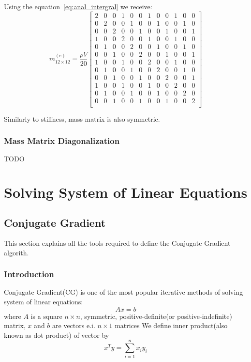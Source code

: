 \documentclass[en]{minipw} %
\begin{document}
Using the equation~\ref{eq:anal_intergral} we receive:
\begin{equation}
m^{(e)}_{12 \times 12} = \dfrac{\rho V}{20}
\begin{bmatrix}
2 & 0 & 0 & 1 & 0 & 0 & 1 & 0 & 0 & 1 & 0 & 0 \\
0 & 2 & 0 & 0 & 1 & 0 & 0 & 1 & 0 & 0 & 1 & 0 \\
0 & 0 & 2 & 0 & 0 & 1 & 0 & 0 & 1 & 0 & 0 & 1 \\
1 & 0 & 0 & 2 & 0 & 0 & 1 & 0 & 0 & 1 & 0 & 0 \\
0 & 1 & 0 & 0 & 2 & 0 & 0 & 1 & 0 & 0 & 1 & 0 \\
0 & 0 & 1 & 0 & 0 & 2 & 0 & 0 & 1 & 0 & 0 & 1 \\
1 & 0 & 0 & 1 & 0 & 0 & 2 & 0 & 0 & 1 & 0 & 0 \\
0 & 1 & 0 & 0 & 1 & 0 & 0 & 2 & 0 & 0 & 1 & 0 \\
0 & 0 & 1 & 0 & 0 & 1 & 0 & 0 & 2 & 0 & 0 & 1 \\
1 & 0 & 0 & 1 & 0 & 0 & 1 & 0 & 0 & 2 & 0 & 0 \\
0 & 1 & 0 & 0 & 1 & 0 & 0 & 1 & 0 & 0 & 2 & 0 \\
0 & 0 & 1 & 0 & 0 & 1 & 0 & 0 & 1 & 0 & 0 & 2 \\
\end{bmatrix}
\end{equation}

Similarly to stiffness, mass matrix is also symmetric.

\subsection{Mass Matrix Diagonalization}
TODO

\chapter{Solving System of Linear Equations}

\section{Conjugate Gradient}
This section explains all the tools required to define the Conjugate Gradient algorith.
\subsection{Introduction}
Conjugate Gradient(CG) is one of the most popular iterative methods of solving system of linear equations:
\begin{equation}
Ax=b
\end{equation}
where $A$ is a square $n \times n$, symmetric, positive-definite(or positive-indefinite) matrix, $x$ and $b$ are vectors e.i. $n \times 1$ matrices
We define inner product(also known as dot product) of vector by 
\begin{equation}
x^{T}y = \sum^{n}_{i=1} x_i y_i
\end{equation}
\end{document}
